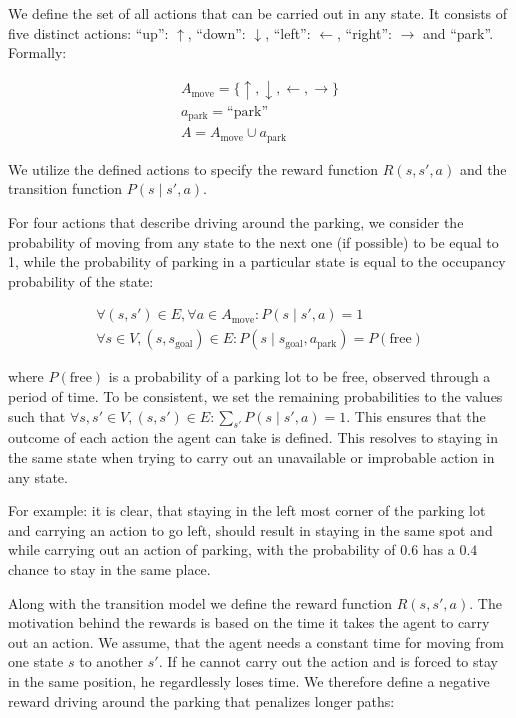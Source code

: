    We define the set of all actions that can be carried out in any state. It
    consists of five distinct actions: ``up'': $\uparrow$, ``down'':
    $\downarrow$, ``left'': $\leftarrow$, ``right'': $\rightarrow$ and
    ``park''. Formally:

    \begin{eqnarray}
        A_{\mbox{move}} = \{ \uparrow, \downarrow, \leftarrow, \rightarrow \} \\
        a_{\mbox{park}} = \mbox{``park''} \\
        A = A_{\mbox{move}} \cup a_{\mbox{park}}
    \end{eqnarray}

    We utilize the defined actions to specify the reward function $R(s, s',
    a)$ and the transition function $P(s \mid s', a)$.

    For four actions that describe driving around the parking, we consider the
    probability of moving from any state to the next one (if possible) to be
    equal to 1, while the probability of parking in a particular state is
    equal to the occupancy probability of the state:

    \begin{eqnarray}
        \forall (s, s') \in E, \forall a \in A_{\mbox{move}} : P(s \mid s', a) = 1 \\
        \forall s \in V, (s,s_{\mbox{goal}}) \in E : P(s \mid s_{\mbox{goal}}, a_{\mbox{park}}) = P(\mbox{free})
    \end{eqnarray}

    where $P(\mbox{free})$ is a probability of a parking lot to be free,
    observed through a period of time. To be consistent, we set the remaining
    probabilities to the values such that $\forall s, s' \in V, (s, s') \in E
    : \sum_{s'}P(s \mid s', a) = 1$. This ensures that the outcome of each
    action the agent can take is defined. This resolves to staying in the same
    state when trying to carry out an unavailable or improbable action in any
    state.

    For example: it is clear, that staying in the left most corner of the
    parking lot and carrying an action to go left, should result in staying in
    the same spot and while carrying out an action of parking, with the
    probability of $0.6$ has a $0.4$ chance to stay in the same place.

    Along with the transition model we define the reward function $R(s,s',a)$.
    The motivation behind the rewards is based on the time it takes the agent
    to carry out an action. We assume, that the agent needs a constant time
    for moving from one state $s$ to another $s'$. If he cannot carry out the
    action and is forced to stay in the same position, he regardlessly loses
    time. We therefore define a negative reward driving around the parking
    that penalizes longer paths:

